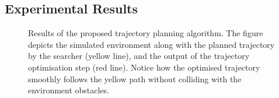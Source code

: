 \subsection{Experimental Results}
\begin{figure}[!t]
	\begin{center}
		\begin{minipage}{.45\linewidth}
			\centering
		\end{minipage}
		\begin{minipage}{.45\linewidth}
			\centering
		\end{minipage}
	\end{center}
	\caption{Results of the proposed trajectory planning algorithm. The figure depicts the simulated environment along with the planned
	trajectory by the searcher (yellow line), and the output of the trajectory optimisation step (red line). Notice how the optimised
	trajectory smoothly follows the yellow path without colliding with the environment obstacles.}%
    \label{FIG:PLANNING-RESULTS-MAP-TRAJECTORY}
\end{figure}
